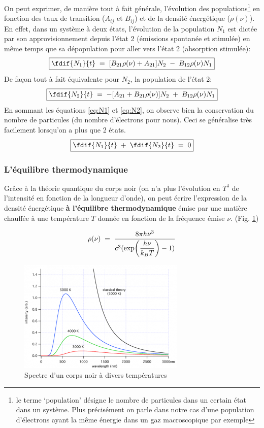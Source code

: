 On peut exprimer, de manière tout à fait générale, l'évolution des populations\footnote{le terme `population' désigne le nombre de particules dans un certain état dans un système. Plus précisément on parle dans notre cas d'une population d'électrons ayant la même énergie dans un gaz macroscopique par exemple} en fonction des taux de transition ($A_{ij}$ et $B_{ij}$) et de la densité énergétique ($\rho(\nu)$).\\
En effet, dans un système à deux états, l'évolution de la population $N_1$ est dictée par son approvisionnement depuis l'état 2 (émissions spontanée et stimulée) en même temps que sa dépopulation pour aller vers l'état 2 (absorption stimulée):
\begin{equation}
\boxed{
    \fdif{N_1}{t}
    \eq  [B_{21}\rho(\nu) + A_{21}]N_2 \;-\; B_{12} \rho(\nu)N_1
    }
    \label{eq:N2}
\end{equation}
De façon tout à fait équivalente pour $N_2$, la population de l'état 2:
\begin{equation}
\boxed{
    \fdif{N_2}{t}
    \eq - [A_{21} + B_{21} \rho(\nu)]N_2 \;+\; B_{12}\rho(\nu)N_1
    \label{eq:N1}
    }
\end{equation}
En sommant les équations \ref{eq:N1} et \ref{eq:N2}, on observe bien la conservation du nombre de particules (du nombre d'électrons pour nous). Ceci se généralise très facilement lorsqu'on a plus que 2 états.
\begin{equation}
\boxed{
    \fdif{N_1}{t}\;+\;\fdif{N_2}{t} \eq 0
    }
\end{equation}



\subsubsection{L'équilibre thermodynamique}



Grâce à la théorie quantique du corps noir (on n'a plus l'évolution en $T^4$ de l'intensité en fonction de la longueur d'onde), on peut écrire l'expression de la densité énergétique \textbf{à l'équilibre thermodynamique} émise par une matière chauffée à une température $T$ donnée en fonction de la fréquence émise $\nu$. (Fig. \ref{fig:corps_noir})

\begin{equation}
    \rho(\nu) \; = \; \dfrac{8\pi h \nu^3}{c^3(\exp(\dfrac{h\nu}{k_BT})-1)}
\end{equation}
\begin{figure}[tph]
    \centering
    \includegraphics[scale=1.1]{Images2/corps_noir.png}
    \caption{Spectre d'un corps noir à divers températures}
    \label{fig:corps_noir}
\end{figure}


